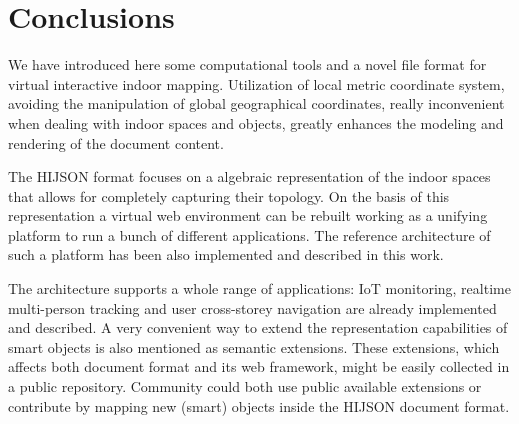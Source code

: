 \section{Conclusions}\label{conclusions}

We have introduced here some computational tools and a novel file format 
for virtual interactive indoor mapping.
Utilization of local metric coordinate system,
avoiding the manipulation of global geographical coordinates, really inconvenient when
dealing with indoor spaces and objects, greatly enhances the modeling and rendering
of the document content. 

The HIJSON format focuses on a algebraic representation of the indoor
spaces that allows for completely capturing their topology. On the basis of
this representation a virtual web environment can be rebuilt working as a
unifying platform to run a bunch of different applications. The reference
architecture of such a platform has been also implemented and described in
this work. 

The architecture supports a whole range of applications: IoT monitoring,
realtime multi-person tracking and user cross-storey navigation are already
implemented and described. A very convenient way to extend the representation
capabilities of smart objects is also mentioned as semantic extensions. These
extensions, which affects both document format and its web framework, might be
easily collected in a public repository. Community could both use public
available extensions or contribute by mapping new (smart) objects inside the
HIJSON document format.
